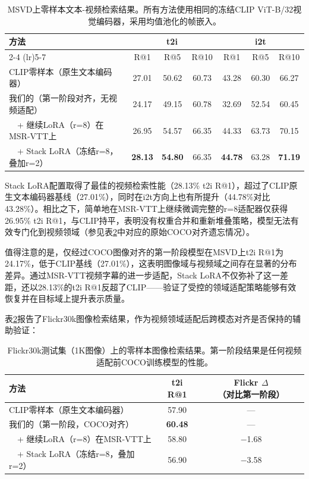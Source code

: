 \documentclass[10pt,a4paper]{ctexart}
\begin{document}
\begin{table}[htbp]
\centering
\caption{MSVD上零样本文本-视频检索结果。所有方法使用相同的冻结CLIP ViT-B/32视觉编码器，采用均值池化的帧嵌入。}
\label{tab:video_results}
\begin{tabular}{lcccccc}
\toprule
方法 & \multicolumn{3}{c}{t2i} & \multicolumn{3}{c}{i2t} \\
\cmidrule(lr){2-4} \cmidrule(lr){5-7}
 & R@1 & R@5 & R@10 & R@1 & R@5 & R@10 \\
\midrule
CLIP零样本（原生文本编码器） & 27.01 & 50.62 & 60.73 & 43.28 & 60.30 & 66.27 \\
我们的（第一阶段对齐，无视频适配） & 24.17 & 49.15 & 60.78 & 32.69 & 52.54 & 60.45 \\
~~+ 继续LoRA（r=8）在MSR-VTT上 & 26.95 & 54.57 & 66.35 & 44.33 & 63.73 & 70.15 \\
~~+ Stack LoRA（冻结r=8，叠加r=2） & \textbf{28.13} & \textbf{54.80} & 66.35 & \textbf{44.78} & 63.28 & \textbf{71.19} \\
\bottomrule
\end{tabular}
\end{table}

Stack LoRA配置取得了最佳的视频检索性能（28.13\% t2i R@1），超过了CLIP原生文本编码器基线（27.01\%），同时在i2t方向上也有所提升（44.78\%对比43.28\%）。相比之下，简单地在MSR-VTT上继续微调完整的r=8适配器仅获得26.95\% t2i R@1，与CLIP持平，表明没有权重合并和重新堆叠策略，模型无法有效专门化到视频领域（参见表\ref{tab:flickr_results}中对应的原始COCO对齐遗忘情况）。

值得注意的是，仅经过COCO图像对齐的第一阶段模型在MSVD上t2i R@1为24.17\%，低于CLIP基线（27.01\%），这表明图像域与视频域之间存在显著的分布差异。通过MSR-VTT视频字幕的进一步适配，Stack LoRA不仅弥补了这一差距，还以28.13\%的t2i R@1反超了CLIP——验证了受控的领域适配策略能够有效恢复并在目标域上提升表示质量。

表\ref{tab:flickr_results}报告了Flickr30k图像检索结果，作为视频领域适配后跨模态对齐是否保持的辅助验证：

\begin{table}[htbp]
\centering
\caption{Flickr30k测试集（1K图像）上的零样本图像检索结果。第一阶段结果是任何视频适配前COCO训练模型的性能。}
\label{tab:flickr_results}
\begin{tabular}{lcc}
\toprule
方法 & t2i R@1 & Flickr $\Delta$（对比第一阶段） \\
\midrule
CLIP零样本（原生文本编码器） & 57.90 & --- \\
我们的（第一阶段，COCO对齐） & \textbf{60.48} & --- \\
~~+ 继续LoRA（r=8）在MSR-VTT上 & 58.80 & $-$1.68 \\
~~+ Stack LoRA（冻结r=8，叠加r=2） & 56.90 & $-$3.58 \\
\bottomrule
\end{tabular}
\end{table}
\end{document}
